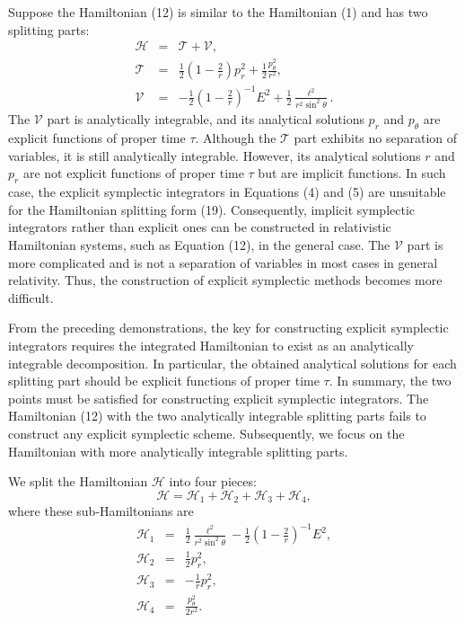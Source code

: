 \documentclass[preprint2]{aastex}
\begin{document}
Suppose the Hamiltonian (12) is similar to the Hamiltonian (1) and
has two splitting parts:
\begin{eqnarray}
\mathcal{H} &=& \mathcal{T}+\mathcal{V}, \\
\mathcal{T} &=& \frac{1}{2}(1-\frac{2}{r})p^{2}_{r}
+\frac{1}{2}\frac{p^{2}_{\theta}}{r^2}, \\
\mathcal{V} &=& -\frac{1}{2}(1-\frac{2}{r})^{-1} E^{2}
+\frac{1}{2}\frac{\ell^{2}}{r^2\sin^2\theta}.
\end{eqnarray}
The $\mathcal{V}$ part is analytically integrable, and its
analytical solutions $p_r$ and $p_{\theta}$ are explicit functions
of proper time $\tau$. Although the $\mathcal{T}$ part exhibits no
separation of variables, it is still analytically integrable.
However, its analytical solutions $r$ and $p_{r}$ are not explicit
functions of proper time $\tau$ but are implicit functions. In
such case, the explicit symplectic integrators in Equations (4)
and (5) are unsuitable for the Hamiltonian splitting form (19).
Consequently, implicit symplectic integrators rather than explicit
ones can be constructed in relativistic Hamiltonian systems, such
as Equation (12), in the general case. The $\mathcal{V}$ part is
more complicated and is not a separation of variables in most
cases in general relativity. Thus, the construction of explicit
symplectic methods becomes more difficult.

From the preceding demonstrations, the key for constructing
explicit symplectic integrators requires the integrated
Hamiltonian to exist as an analytically integrable decomposition.
In particular, the obtained analytical solutions for each
splitting part should be explicit functions of proper time $\tau$.
In summary, the two points must be satisfied for constructing
explicit symplectic integrators. The Hamiltonian (12) with the two
analytically integrable splitting parts fails to construct any
explicit symplectic scheme. Subsequently, we focus on the
Hamiltonian with more analytically integrable splitting parts.

We split the Hamiltonian $\mathcal{H}$ into four pieces:
\begin{equation}
\mathcal{H}=\mathcal{H}_1+\mathcal{H}_2+\mathcal{H}_3+\mathcal{H}_4,
\end{equation}
where these sub-Hamiltonians are
\begin{eqnarray}
\mathcal{H}_1 &=&\frac{1}{2}\frac{\ell^{2}}{r^2\sin^2\theta}
-\frac{1}{2}(1-\frac{2}{r})^{-1} E^{2}, \\
\mathcal{H}_{2} &=& \frac{1}{2}p^{2}_{r},\\
\mathcal{H}_{3} &=& -\frac{1}{r}p^{2}_{r},\\
\mathcal{H}_{4} &=& \frac{p^{2}_{\theta}}{2r^2}.
\end{eqnarray}
\end{document}
